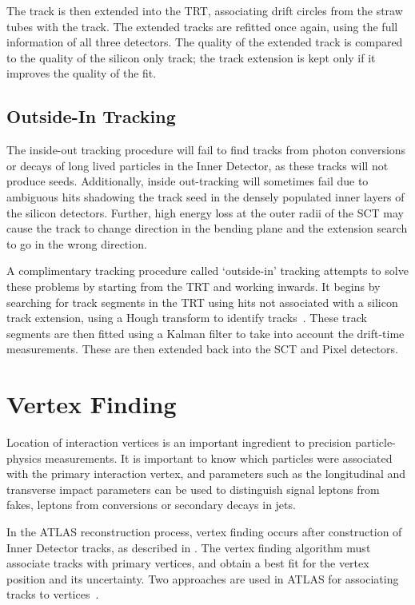 The track is then extended into the TRT, associating drift circles from the
straw tubes with the track. The extended tracks are refitted once again, using
the full information of all three detectors. The quality of the extended track
is compared to the quality of the silicon only track; the track extension is
kept only if it improves the quality of the fit.

\subsection{Outside-In Tracking}

The inside-out tracking procedure will fail to find tracks from photon conversions or
decays of long lived particles in the Inner Detector, as these tracks will not
produce seeds. Additionally, inside out-tracking will sometimes fail due to
ambiguous hits shadowing the track seed in the densely populated inner layers of
the silicon detectors. Further, high energy loss at the outer radii of the SCT may cause
the track to change direction in the bending plane and the extension search to
go in the wrong direction. 

A complimentary tracking procedure called `outside-in'
tracking attempts to solve these problems by starting from the TRT and working
inwards. It begins by searching for track segments in the TRT using hits not
associated with a silicon track extension, using a Hough transform to identify
tracks~\cite{Baines:683897}. These track segments are then fitted using a Kalman
filter to take into account the drift-time measurements. These are then extended back into the
SCT and Pixel detectors.

\section{Vertex Finding}
\label{sec:reco-vertexing}

Location of interaction vertices is an important ingredient to precision
particle-physics measurements. It is important to know which particles were
associated with the primary interaction vertex, and parameters such as the
longitudinal and transverse impact parameters can be used to distinguish signal
leptons from fakes, leptons from conversions or secondary decays in jets.

In the ATLAS reconstruction process, vertex finding occurs after construction of
Inner Detector tracks, as described in . The
vertex finding algorithm must associate tracks with primary vertices, and obtain
a best fit for the vertex position and its uncertainty. Two approaches are
used in ATLAS for associating tracks to vertices~\cite{1742-6596-119-3-032033}. 

